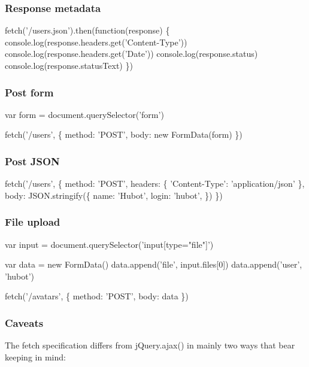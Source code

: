 \subsubsection*{Response metadata}


\begin{DoxyCode}
fetch('/users.json').then(function(response) \{
  console.log(response.headers.get('Content-Type'))
  console.log(response.headers.get('Date'))
  console.log(response.status)
  console.log(response.statusText)
\})
\end{DoxyCode}


\subsubsection*{Post form}


\begin{DoxyCode}
var form = document.querySelector('form')

fetch('/users', \{
  method: 'POST',
  body: new FormData(form)
\})
\end{DoxyCode}


\subsubsection*{Post J\+S\+ON}


\begin{DoxyCode}
fetch('/users', \{
  method: 'POST',
  headers: \{
    'Content-Type': 'application/json'
  \},
  body: JSON.stringify(\{
    name: 'Hubot',
    login: 'hubot',
  \})
\})
\end{DoxyCode}


\subsubsection*{File upload}


\begin{DoxyCode}
var input = document.querySelector('input[type="file"]')

var data = new FormData()
data.append('file', input.files[0])
data.append('user', 'hubot')

fetch('/avatars', \{
  method: 'POST',
  body: data
\})
\end{DoxyCode}


\subsubsection*{Caveats}

The {\ttfamily fetch} specification differs from {\ttfamily j\+Query.\+ajax()} in mainly two ways that bear keeping in mind\+:



